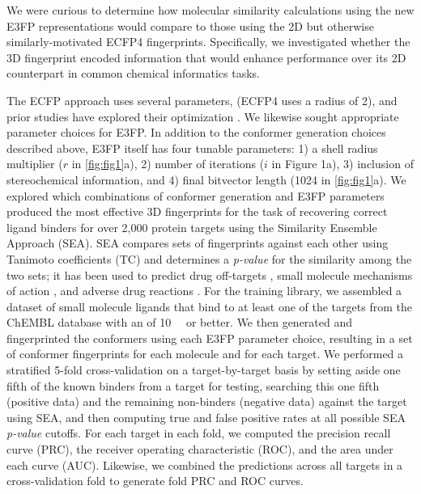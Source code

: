 \documentclass[../../main.tex]{subfiles}
\begin{document}
\begin{refsection}
	We were curious to determine how molecular similarity calculations using the new E3FP representations would compare to those using the 2D but otherwise similarly-motivated ECFP4 fingerprints.
	Specifically, we investigated whether the 3D fingerprint encoded information that would enhance performance over its 2D counterpart in common chemical informatics tasks.

	The ECFP approach uses several parameters, (\eg ECFP4 uses a radius of 2), and prior studies have explored their optimization  \supercite{hert_2004}.
	We likewise sought appropriate parameter choices for E3FP.
	In addition to the conformer generation choices described above, E3FP itself has four tunable parameters: 1) a shell radius multiplier ($r$ in \cref{fig:fig1}a), 2) number of iterations ($i$ in Figure 1a), 3) inclusion of stereochemical information, and 4) final bitvector length (1024 in \cref{fig:fig1}a).
	We explored which combinations of conformer generation and E3FP parameters produced the most effective 3D fingerprints for the task of recovering correct ligand binders for over 2,000 protein targets using the Similarity Ensemble Approach (SEA).
	SEA compares sets of fingerprints against each other using Tanimoto coefficients (TC) and determines a \emph{p-value} for the similarity among the two sets; it has been used to predict drug off-targets \supercite{keiser_2007,keiser_2009,degraw_2010,yee_2015}, small molecule mechanisms of action \supercite{laggner_2011,lemieux_2013,bruni_2016}, and adverse drug reactions  \supercite{keiser_2007,lounkine_2012,lorberbaum_2015}.
	For the training library, we assembled a dataset of small molecule ligands that bind to at least one of the targets from the ChEMBL database with an \ICfifty{} of  \SI{10}{\micro\molar} or better.
	We then generated and fingerprinted the conformers using each E3FP parameter choice, resulting in a set of conformer fingerprints for each molecule and for each target.
	We performed a stratified 5-fold cross-validation on a target-by-target basis by setting aside one fifth of the known binders from a target for testing, searching this one fifth (positive data) and the remaining non-binders (negative data) against the target using SEA, and then computing true and false positive rates at all possible SEA \emph{p-value} cutoffs.
	For each target in each fold, we computed the precision recall curve (PRC), the receiver operating characteristic (ROC), and the area under each curve (AUC).
	Likewise, we combined the predictions across all targets in a cross-validation fold to generate fold PRC and ROC curves.


\end{refsection}
\end{document}
